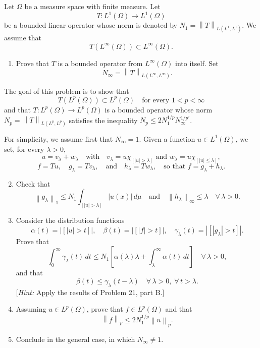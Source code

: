 \documentclass[12pt]{article}
\newcommand{\norm}[1]{\left\|#1\right\|}
\newcommand{\abs}[1]{\left|#1\right|}
\begin{document}
\medskip
 
Let $\Omega$ be a measure space with finite measure. Let
\[
T : L^1(\Omega) \to L^1(\Omega)
\]
be a bounded linear operator whose norm is denoted by $N_1 = \norm{T}_{L(L^1,L^1)}$.
We assume that
\[
T(L^\infty(\Omega)) \subset L^\infty(\Omega).
\]
 
\begin{enumerate}
\item Prove that $T$ is a bounded operator from $L^\infty(\Omega)$ into itself. Set
\[
N_\infty = \norm{T}_{L(L^\infty,L^\infty)}.
\]
\end{enumerate}
 
\noindent The goal of this problem is to show that
\[
T(L^p(\Omega)) \subset L^p(\Omega) \quad \text{for every } 1 < p < \infty
\]
and that $T : L^p(\Omega) \to L^p(\Omega)$ is a bounded operator whose norm
$N_p = \norm{T}_{L(L^p,L^p)}$ satisfies the inequality $N_p \le 2 N_1^{1/p} N_\infty^{1/p'}$.
 
\medskip
 
\noindent For simplicity, we assume first that $N_\infty = 1$. Given a function $u \in L^1(\Omega)$, we
set, for every $\lambda > 0$,
\[
u = v_\lambda + w_\lambda \quad \text{with} \quad v_\lambda = u\chi_{[\abs{u}>\lambda]}
\text{ and } w_\lambda = u\chi_{[\abs{u}\le\lambda]},
\]
\[
f = Tu, \quad g_\lambda = Tv_\lambda, \quad \text{and} \quad h_\lambda = Tw_\lambda,
\quad \text{so that } f = g_\lambda + h_\lambda.
\]
 
\begin{enumerate}
\setcounter{enumi}{1}
\item Check that
\[
\norm{g_\lambda}_1 \le N_1 \int_{[\abs{u}>\lambda]} \abs{u(x)}\,d\mu
\quad \text{and} \quad \norm{h_\lambda}_\infty \le \lambda \quad \forall\, \lambda > 0.
\]
 
\item Consider the distribution functions
\[
\alpha(t) = \abs{[\abs{u}>t]}, \quad \beta(t) = \abs{[\abs{f}>t]}, \quad \gamma_\lambda(t) = \abs{[\abs{g_\lambda}>t]}.
\]
Prove that
\[
\int_0^\infty \gamma_\lambda(t)\,dt \le N_1\left[\alpha(\lambda)\lambda + \int_\lambda^\infty \alpha(t)\,dt\right]
\quad \forall\, \lambda > 0,
\]
and that
\[
\beta(t) \le \gamma_\lambda(t-\lambda) \quad \forall\, \lambda > 0,\; \forall\, t > \lambda.
\]
[\textit{Hint:} Apply the results of Problem 21, part B.]
 
\item Assuming $u \in L^p(\Omega)$, prove that $f \in L^p(\Omega)$ and that
\[
\norm{f}_p \le 2N_1^{1/p}\norm{u}_p.
\]
 
\item Conclude in the general case, in which $N_\infty \neq 1$.
\end{enumerate}
 
\end{document}
